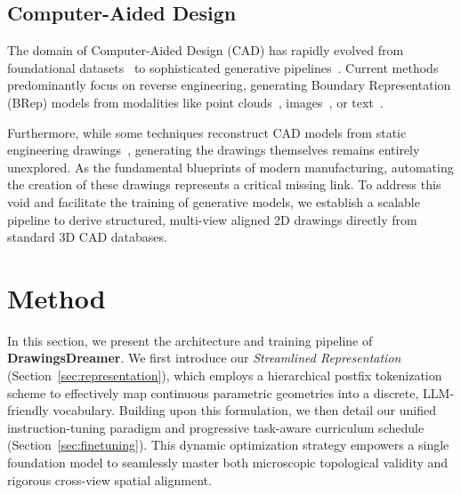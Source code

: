 \documentclass{article}
\begin{document}
\subsection{Computer-Aided Design}
The domain of Computer-Aided Design (CAD) has rapidly evolved from foundational datasets~\cite{wu2021deepcad,koch2019abc,willis2021fusion} to sophisticated generative pipelines~\cite{li2025brepgpt,xu2025autobrep,li2025stitch,lee2025brepdiff,li2025revisiting,wu2024cadvlm,alrashedy2024generating,wu2021deepcad,xu2024brepgen,li2025dtgbrepgen,liu2026hidigen,khan2024cad,rukhovich2025cad,chen2025cadcrafter,li2025caddreamer,wang2025cadgpt,alrashedy2024generating,yavartanoo2024text2cad,khan2026dreamcad}. Current methods predominantly focus on reverse engineering, generating Boundary Representation (BRep) models from modalities like point clouds~\cite{wu2021deepcad,xu2024brepgen,li2025dtgbrepgen,liu2026hidigen,khan2024cad,rukhovich2025cad}, images~\cite{chen2025cadcrafter,li2025caddreamer}, or text~\cite{wang2025cadgpt,alrashedy2024generating,yavartanoo2024text2cad,khan2026dreamcad}. 

Furthermore, while some techniques reconstruct CAD models from static engineering drawings~\cite{gong2006reconstruction111,kuo1998reconstruction222,liu2001reconstruction333,wang1993survey444,furferi20102d555,camba2022sketch,harish2021photo2cad,puhachov2023reconstruction,wang20252d,zhang2023automatic,qin2025drawing2cad}, generating the drawings themselves remains entirely unexplored. As the fundamental blueprints of modern manufacturing, automating the creation of these drawings represents a critical missing link. To address this void and facilitate the training of generative models, we establish a scalable pipeline to derive structured, multi-view aligned 2D drawings directly from standard 3D CAD databases.
\section{Method} \label{sec: method}
In this section, we present the architecture and training pipeline of \textbf{DrawingsDreamer}.  We first introduce our \textit{Streamlined Representation} (Section~\ref{sec:representation}), which employs a hierarchical postfix tokenization scheme to effectively map continuous parametric geometries into a discrete, LLM-friendly vocabulary. Building upon this formulation, we then detail our unified instruction-tuning paradigm and progressive task-aware curriculum schedule (Section~\ref{sec:finetuning}). This dynamic optimization strategy empowers a single foundation model to seamlessly master both microscopic topological validity and rigorous cross-view spatial alignment.
\end{document}
